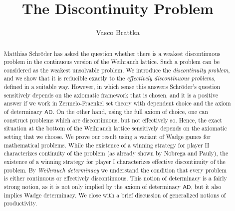 \documentclass{amsart}
\title{The Discontinuity Problem}
\author{Vasco Brattka}
\def\AD{\mathsf{AD}}
\begin{document}
 


\theoremstyle{definition}
\newtheorem{theorem}{Theorem}
\newtheorem{definition}[theorem]{Definition}
\newtheorem{problem}[theorem]{Problem}
\newtheorem{assumption}[theorem]{Assumption}
\newtheorem{corollary}[theorem]{Corollary}
\newtheorem{proposition}[theorem]{Proposition}
\newtheorem{lemma}[theorem]{Lemma}
\newtheorem{observation}[theorem]{Observation}
\newtheorem{fact}[theorem]{Fact}
\newtheorem{question}[theorem]{Question}
\newtheorem{example}[theorem]{Example}
\newtheorem{convention}[theorem]{Convention}
\newtheorem{conjecture}[theorem]{Conjecture}

\keywords{}

\begin{abstract}
Matthias Schr\"oder has asked the question whether there is a weakest discontinuous problem in the 
continuous version of the Weihrauch lattice. Such a problem can be considered as the weakest unsolvable problem.
We introduce the {\em discontinuity problem}, and we show that it 
is reducible exactly to the {\em effectively  discontinuous problems}, defined in a suitable way.
However, in which sense this answers Schr\"oder's question sensitively depends on the axiomatic framework that is chosen, and it is a positive answer
if we work in Zermelo-Fraenkel set theory with dependent choice and the axiom of determinacy $\AD$.
On the other hand, using the full axiom of choice, one can construct problems which are discontinuous, but not
effectively so. 
Hence, the exact situation at the bottom of the Weihrauch lattice sensitively depends on the axiomatic setting that we choose.
We prove our result using a variant of Wadge games for mathematical problems. While the existence of a winning strategy for
player II characterizes continuity of the problem (as already shown by Nobrega and Pauly), the existence of a winning strategy for player I characterizes effective discontinuity of the problem. 
By {\em Weihrauch determinacy} we understand the condition that every problem is either continuous or
effectively discontinuous. This notion of determinacy is a fairly strong notion, as it is not only implied by the axiom of determinacy $\AD$, but
it also implies Wadge determinacy. We close with a brief discussion of generalized notions of productivity.
\end{abstract}

\maketitle
\end{document}
